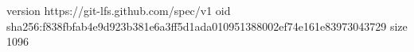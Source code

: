 version https://git-lfs.github.com/spec/v1
oid sha256:f838fbfab4e9d923b381e6a3ff5d1ada010951388002ef74e161e83973043729
size 1096
